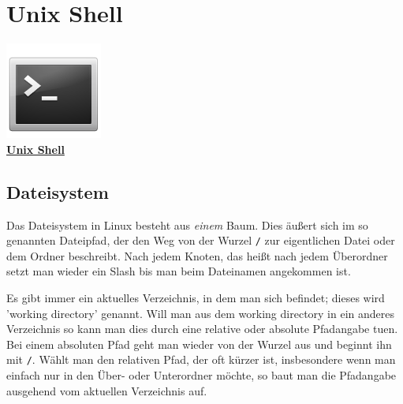 \chapter{Unix Shell}
\begin{center}
    \includegraphics[width=120px]{img/term.pdf} \\
    \textbf{\href{http://en.wikipedia.org/wiki/Unix_shell}{Unix Shell}}
\end{center}

\section{Dateisystem}
Das Dateisystem in Linux besteht aus \emph{einem} Baum.
Dies äußert sich im so genannten Dateipfad, der den Weg von der Wurzel \texttt{/} zur eigentlichen Datei oder dem Ordner beschreibt.
Nach jedem Knoten, das heißt nach jedem Überordner setzt man wieder ein Slash bis man beim Dateinamen angekommen ist.

Es gibt immer ein aktuelles Verzeichnis, in dem man sich befindet; dieses wird 'working directory' genannt.
Will man aus dem working directory in ein anderes Verzeichnis so kann man dies durch eine relative oder absolute Pfadangabe tuen.
Bei einem absoluten Pfad geht man wieder von der Wurzel aus und beginnt ihn mit \texttt{/}.
Wählt man den relativen Pfad, der oft kürzer ist, insbesondere wenn man einfach nur in den Über- oder Unterordner möchte, so baut man die Pfadangabe ausgehend vom aktuellen Verzeichnis auf.

